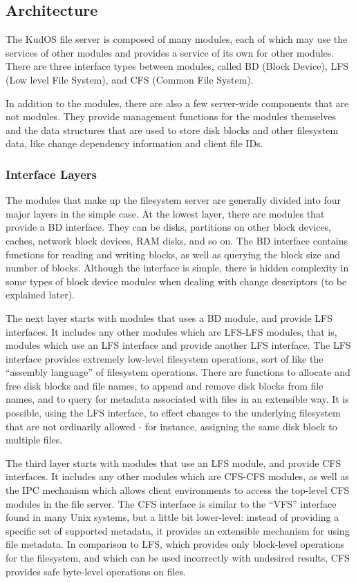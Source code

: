 \subsection{Architecture}
\label{sec:solution:arch}

The KudOS file server is composed of many modules, each of which may use the
services of other modules and provides a service of its own for other modules.
There are three interface types between modules, called BD (Block Device), LFS
(Low level File System), and CFS (Common File System).

In addition to the modules, there are also a few server-wide components that are
not modules. They provide management functions for the modules themselves and
the data structures that are used to store disk blocks and other filesystem
data, like change dependency information and client file IDs.

\subsubsection{Interface Layers}
\label{sec:solution:arch:layers}

The modules that make up the filesystem server are generally divided into four
major layers in the simple case. At the lowest layer, there are modules that
provide a BD interface. They can be disks, partitions on other block devices,
caches, network block devices, RAM disks, and so on. The BD interface contains
functions for reading and writing blocks, as well as querying the block size and
number of blocks. Although the interface is simple, there is hidden complexity
in some types of block device modules when dealing with change descriptors (to
be explained later).

The next layer starts with modules that uses a BD module, and provide LFS
interfaces. It includes any other modules which are LFS-LFS modules, that is,
modules which use an LFS interface and provide another LFS interface. The LFS
interface provides extremely low-level filesystem operations, sort of like the
``assembly language'' of filesystem operations. There are functions to allocate
and free disk blocks and file names, to append and remove disk blocks from file
names, and to query for metadata associated with files in an extensible way. It
is possible, using the LFS interface, to effect changes to the underlying
filesystem that are not ordinarily allowed - for instance, assigning the same
disk block to multiple files.

The third layer starts with modules that use an LFS module, and provide CFS
interfaces. It includes any other modules which are CFS-CFS modules, as well as
the IPC mechanism which allows client environments to access the top-level CFS
modules in the file server. The CFS interface is similar to the ``VFS''
interface found in many Unix systems, but a little bit lower-level: instead of
providing a specific set of supported metadata, it provides an extensible
mechanism for using file metadata. In comparison to LFS, which provides only
block-level operations for the filesystem, and which can be used incorrectly
with undesired results, CFS provides safe byte-level operations on files.

